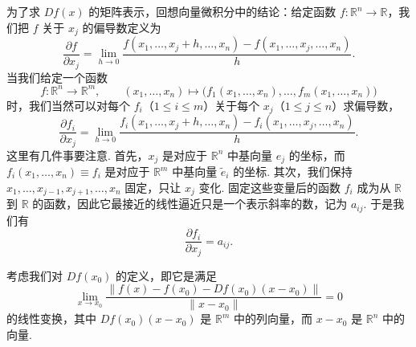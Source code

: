 为了求 $Df(x)$ 的矩阵表示，回想向量微积分中的结论：给定函数 $f:\mathbb{R}^n\to\mathbb{R}$，我们把 $f$ 关于 $x_j$ 的偏导数定义为
\[
\frac{\partial f}{\partial x_j}=\lim_{h\to0}\frac{f(x_1,\ldots,x_j+h,\ldots,x_n)-f(x_1,\ldots,x_j,\ldots,x_n)}{h}.
\]
当我们给定一个函数
\[
f:\mathbb{R}^n\to\mathbb{R}^m,\qquad
(x_1,\ldots,x_n)\longmapsto\bigl(f_1(x_1,\ldots,x_n),\ldots,f_m(x_1,\ldots,x_n)\bigr)
\]
时，我们当然可以对每个 $f_i$（$1\leq i\leq m$）关于每个 $x_j$（$1\leq j\leq n$）求偏导数，
\[
\frac{\partial f_i}{\partial x_j}=\lim_{h\to0}\frac{f_i(x_1,\ldots,x_j+h,\ldots,x_n)-f_i(x_1,\ldots,x_j,\ldots,x_n)}{h}.
\]
这里有几件事要注意. 首先，$x_j$ 是对应于 $\mathbb{R}^n$ 中基向量 $e_j$ 的坐标，而 $f_i(x_1,\ldots,x_n)\equiv f_i$ 是对应于 $\mathbb{R}^m$ 中基向量 $\tilde{e}_i$ 的坐标. 其次，我们保持 $x_1,\ldots,x_{j-1},x_{j+1},\ldots,x_n$ 固定，只让 $x_j$ 变化. 固定这些变量后的函数 $f_i$ 成为从 $\mathbb{R}$ 到 $\mathbb{R}$ 的函数，因此它最接近的线性逼近只是一个表示斜率的数，记为 $a_{ij}$. 于是我们有
\[
\frac{\partial f_i}{\partial x_j}=a_{ij}.
\]

考虑我们对 $Df(x_0)$ 的定义，即它是满足
\[
\lim_{x\to x_0}\frac{\|f(x)-f(x_0)-Df(x_0)(x-x_0)\|}{\|x-x_0\|}=0
\]
的线性变换，其中 $Df(x_0)(x-x_0)$ 是 $\mathbb{R}^m$ 中的列向量，而 $x-x_0$ 是 $\mathbb{R}^n$ 中的向量.

